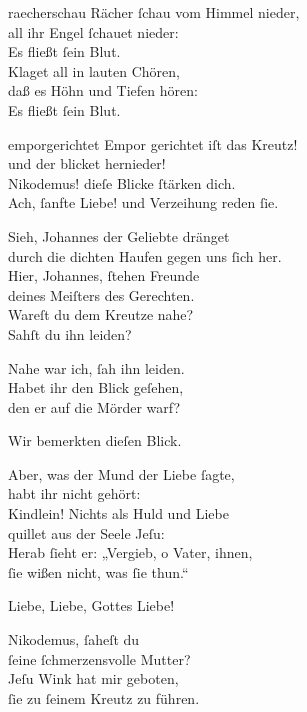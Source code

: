 \documentclass[abbrwidth=6em,tocstyle=ref-genre,toe=false]{ees}
\begin{document}
{\begin{movement}{raecherschau}
  Rächer ſchau vom Himmel nieder,\\
  all ihr Engel ſchauet nieder:\\
  Es fließt ſein Blut.\\
  Klaget all in lauten Chören,\\
  daß es Höhn und Tiefen hören:\\
  Es fließt ſein Blut.
\end{movement}

\begin{movement}{emporgerichtet}
  \voice[Joseph]
  Empor gerichtet iſt das Kreutz!\\
  und der blicket hernieder!\\
  Nikodemus! dieſe Blicke ſtärken dich.\\
  Ach, ſanfte Liebe! und Verzeihung reden ſie.

  \voice[Blindgebohrner]
  Sieh, Johannes der Geliebte dränget\\
  durch die dichten Haufen gegen uns ſich her.\\
  Hier, Johannes, ſtehen Freunde\\
  deines Meiſters des Gerechten.\\
  Wareſt du dem Kreutze nahe?\\
  Sahſt du ihn leiden?

  \voice[Johannes]
  Nahe war ich, ſah ihn leiden.\\
  Habet ihr den Blick geſehen,\\
  den er auf die Mörder warf?

  \voice[Joseph]
  Wir bemerkten dieſen Blick.

  \voice[Johannes]
  Aber, was der Mund der Liebe ſagte,\\
  habt ihr nicht gehört:\\
  Kindlein! Nichts als Huld und Liebe\\
  quillet aus der Seele Jeſu:\\
  Herab ſieht er: „Vergieb, o Vater, ihnen,\\
  ſie wißen nicht, was ſie thun.“

  Liebe, Liebe, Gottes Liebe!

  \voice[Johannes]
  Nikodemus, ſaheſt du\\
  ſeine ſchmerzensvolle Mutter?\\
  Jeſu Wink hat mir geboten,\\
  ſie zu ſeinem Kreutz zu führen.


\end{movement}}
\end{document}
